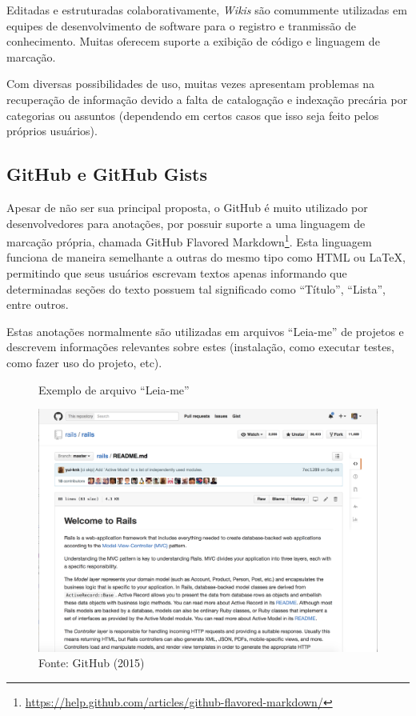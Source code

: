 Editadas e estruturadas colaborativamente, \textit{Wikis} são comummente utilizadas em equipes de desenvolvimento de software para o registro e tranmissão de conhecimento. Muitas oferecem suporte a exibição de código e linguagem de marcação.

Com diversas possibilidades de uso, muitas vezes apresentam problemas na recuperação de informação devido a falta de catalogação e indexação precária por categorias ou assuntos (dependendo em certos casos que isso seja feito pelos próprios usuários).

\subsection{GitHub e GitHub Gists}

Apesar de não ser sua principal proposta, o GitHub é muito utilizado por desenvolvedores para anotações, por possuir suporte a uma linguagem de marcação própria, chamada GitHub Flavored Markdown\footnote{\url{https://help.github.com/articles/github-flavored-markdown/}}. Esta linguagem funciona de maneira semelhante a outras do mesmo tipo como HTML ou LaTeX, permitindo que seus usuários escrevam textos apenas informando que determinadas seções do texto possuem tal significado como ``Título'', ``Lista'', entre outros.

Estas anotações normalmente são utilizadas em arquivos ``Leia-me'' de projetos e descrevem informações relevantes sobre estes (instalação, como executar testes, como fazer uso do projeto, etc).

\begin{figure}[h!]
	\centering
    \caption{Exemplo de arquivo ``Leia-me''}
    \includegraphics[width=15cm]{Imagens/print-readme.png}
	\caption*{Fonte: GitHub (2015)}
\end{figure}

